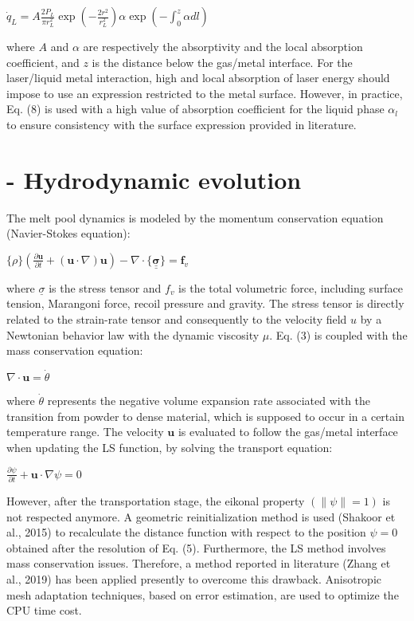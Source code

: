 \documentclass[10pt]{article}
\begin{document}
$\dot{q}_{L}=A \frac{2 P_{L}}{\pi r_{L}^{2}} \exp \left(-\frac{2 r^{2}}{r_{L}^{2}}\right) \alpha \exp \left(-\int_{0}^{z} \alpha d l\right)$

where $A$ and $\alpha$ are respectively the absorptivity and the local absorption coefficient, and $z$ is the distance below the gas/metal interface. For the laser/liquid metal interaction, high and local absorption of laser energy should impose to use an expression restricted to the metal surface. However, in practice, Eq. (8) is used with a high value of absorption coefficient for the liquid phase $\alpha_{l}$ to ensure consistency with the surface expression provided in literature.

\section*{- Hydrodynamic evolution}
The melt pool dynamics is modeled by the momentum conservation equation (Navier-Stokes equation):

$\{\rho\}\left(\frac{\partial \boldsymbol{u}}{\partial t}+(\boldsymbol{u} \cdot \nabla) \boldsymbol{u}\right)-\nabla \cdot\{\underline{\underline{\boldsymbol{\sigma}}}\}=\boldsymbol{f}_{v}$

where $\underline{\sigma}$ is the stress tensor and $f_{v}$ is the total volumetric force, including surface tension, Marangoni force, recoil pressure and gravity. The stress tensor is directly related to the strain-rate tensor and consequently to the velocity field $u$ by a Newtonian behavior law with the dynamic viscosity $\mu$. Eq. (3) is coupled with the mass conservation equation:

$\nabla \cdot \boldsymbol{u}=\dot{\theta}$

where $\dot{\theta}$ represents the negative volume expansion rate associated with the transition from powder to dense material, which is supposed to occur in a certain temperature range. The velocity $\boldsymbol{u}$ is evaluated to follow the gas/metal interface when updating the LS function, by solving the transport equation:

$\frac{\partial \psi}{\partial t}+\boldsymbol{u} \cdot \nabla \psi=0$

However, after the transportation stage, the eikonal property $(\|\psi\|=1)$ is not respected anymore. A geometric reinitialization method is used (Shakoor et al., 2015) to recalculate the distance function with respect to the position $\psi=0$ obtained after the resolution of Eq. (5). Furthermore, the LS method involves mass conservation issues. Therefore, a method reported in literature (Zhang et al., 2019) has been applied presently to overcome this drawback. Anisotropic mesh adaptation techniques, based on error estimation, are used to optimize the CPU time cost.
\end{document}
